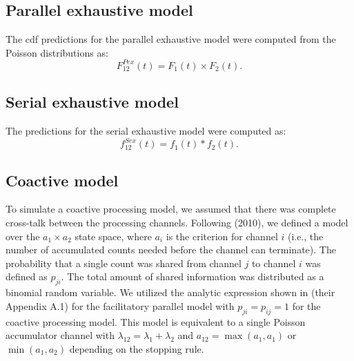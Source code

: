 \subsection{Parallel exhaustive model} 
The cdf predictions for the parallel exhaustive model were computed from the Poisson distributions as:
\begin{equation} \tag{6}
	F^{Pex}_{12}(t) = F_1(t) \times F_2(t).
    \label{eq:parex}
\end{equation}
\noindent


\subsection{Serial exhaustive model} The predictions for the serial exhaustive model were computed as:
\begin{equation} \tag{7}
	f^{Sex}_{12}(t) = f_1(t) *  f_2(t).
    \label{eq:serex}
\end{equation}

\subsection{Coactive model} 
To simulate a coactive processing model, we assumed that there was complete cross-talk between the processing channels. Following \citeauthor{Johnson2010b} (2010), we defined a model over the $a_1 \times a_2$ state space, where $a_i$ is the criterion for channel $i$ (i.e., the number of accumulated counts needed before the channel can terminate). The probability that a single count was shared from channel $j$ to channel $i$ was defined as $p_{ji} $. The total amount of shared information was distributed as a binomial random variable. We utilized the analytic expression shown in \citeauthor{Johnson2010b} (their Appendix A.1) for the facilitatory parallel model with $p_{ji} = p_{ij} = 1$ for the coactive processing model. 
This model is equivalent to a single Poisson accumulator channel with $\lambda_{12} = \lambda_1 + \lambda_2$ and $a_{12} = \max(a_1, a_1)$ or $\min(a_1, a_2)$ depending on the stopping rule. 

